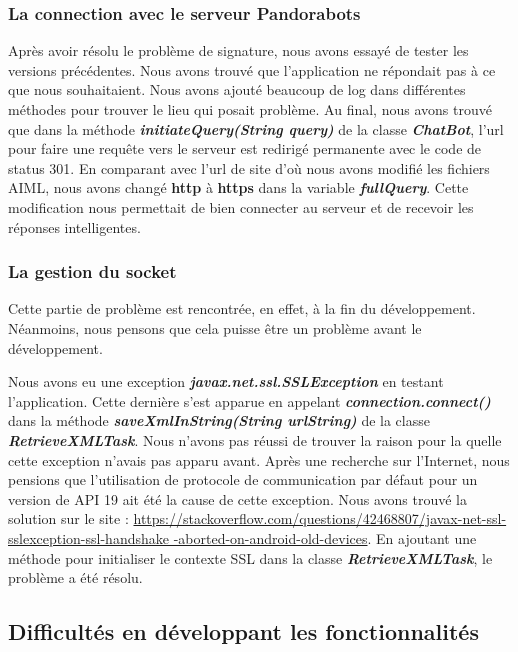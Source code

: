 \subsubsection{La connection avec le serveur Pandorabots}

\indent Après avoir résolu le problème de signature, nous avons essayé de tester les versions précédentes. Nous avons trouvé que l'application ne répondait pas à ce que nous souhaitaient. Nous avons ajouté beaucoup de log dans différentes méthodes pour trouver le lieu qui posait problème. Au final, nous avons trouvé que dans la méthode \textbf{\emph{initiateQuery(String query)}} de la classe \textbf{\emph{ChatBot}}, l'url pour faire une requête vers le serveur est redirigé permanente avec le code de status 301. En comparant avec l'url de site d'où nous avons modifié les fichiers AIML, nous avons changé \textbf{http} à \textbf{https} dans la variable \textbf{\emph{fullQuery}}. Cette modification nous permettait de bien connecter au serveur et de recevoir les réponses intelligentes.

\subsubsection{La gestion du socket}

\indent Cette partie de problème est rencontrée, en effet, à la fin du développement. Néanmoins, nous pensons que cela puisse être un problème avant le développement.

\indent Nous avons eu une exception \textbf{\emph{javax.net.ssl.SSLException}} en testant l'application. Cette dernière s'est apparue en appelant \textbf{\emph{connection.connect()}} dans la méthode \textbf{\emph{saveXmlInString(String urlString)}} de la classe \textbf{\emph{RetrieveXMLTask}}. Nous n'avons pas réussi de trouver la raison pour la quelle cette exception n'avais pas apparu avant. Après une recherche sur l'Internet, nous pensions que l'utilisation de protocole de communication par défaut pour un version de API 19 ait été la cause de cette exception. Nous avons trouvé la solution sur le site : \url{https://stackoverflow.com/questions/42468807/javax-net-ssl-sslexception-ssl-handshake -aborted-on-android-old-devices}. En ajoutant une méthode pour initialiser le contexte SSL dans la classe \textbf{\emph{RetrieveXMLTask}}, le problème a été résolu.

\subsection{Difficultés en développant les fonctionnalités}

